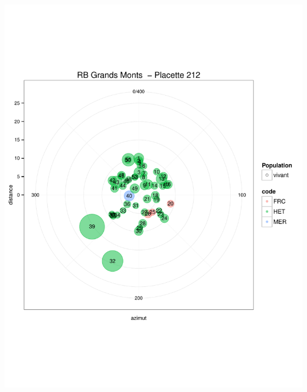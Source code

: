 \documentclass[a4paper]{book}\usepackage[]{graphicx}\usepackage[]{color}
\makeatletter
\def\maxwidth{ %
  \ifdim\Gin@nat@width>\linewidth
    \linewidth
  \else
    \Gin@nat@width
  \fi
}
\newenvironment{knitrout}{}{} %
\makeatother
\begin{document}
\begin{knitrout}
{\centering \includegraphics[width=\maxwidth]{Figures/PlanArbres-20} 

}





\end{knitrout}
\end{document}
